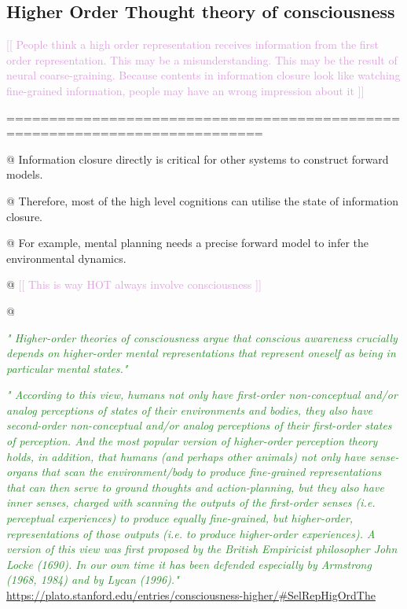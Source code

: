 \documentclass[utf8]{article}
\newenvironment{ants}
			{
			 \begin{easylist}[itemize]
			}
			{
			\end{easylist}
			}
\newcommand{\rewrite}[1]{\textcolor{ForestGreen}{\textit{"#1"}}\newline}
\newcommand{\idea}[1]{\noindent
				\textcolor{Plum}{[[ #1 ]]\newline}}
\begin{document}
		
		

				
			
		\subsection{Higher Order Thought theory of consciousness}	
			\idea{People think a high order representation receives information from the first order representation. This may be a misunderstanding. This may be the result of neural coarse-graining. Because contents in information closure look like watching fine-grained information, people may have an wrong impression about it}
		
			============================================================================			
			\begin{ants}
				@ Information closure directly is critical for other systems to construct forward models. 
				
				@ Therefore, most of the high level cognitions can utilise the state of information closure.
				
				@ For example, mental planning needs a precise forward model to infer the environmental dynamics. 
				
				@ \idea{This is way HOT always involve consciousness }
				
				@ \cite{rosenthal2005consciousness}
			\end{ants}
		
		
			\rewrite{
				Higher-order theories of consciousness argue that conscious awareness crucially depends on higher-order mental representations that represent oneself as being in particular mental states.} \cite{lau2011empirical}
		
		
			\rewrite{
				According to this view, humans not only have first-order non-conceptual and/or analog perceptions of states of their environments and bodies, they also have second-order non-conceptual and/or analog perceptions of their first-order states of perception. And the most popular version of higher-order perception theory holds, in addition, that humans (and perhaps other animals) not only have sense-organs that scan the environment/body to produce fine-grained representations that can then serve to ground thoughts and action-planning, but they also have inner senses, charged with scanning the outputs of the first-order senses (i.e. perceptual experiences) to produce equally fine-grained, but higher-order, representations of those outputs (i.e. to produce higher-order experiences). A version of this view was first proposed by the British Empiricist philosopher John Locke (1690). In our own time it has been defended especially by Armstrong (1968, 1984) and by Lycan (1996).} \url{https://plato.stanford.edu/entries/consciousness-higher/#SelRepHigOrdThe}
			
\end{document}
